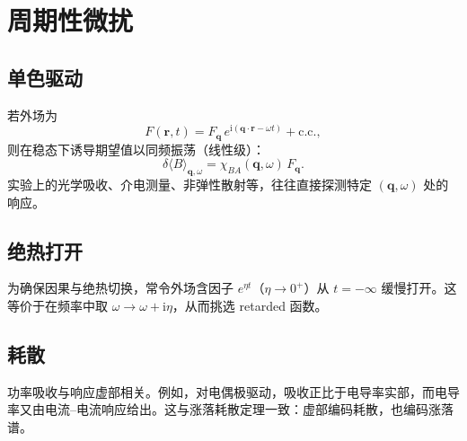 \section{周期性微扰}

\subsection{单色驱动}

若外场为
\begin{equation}
  F(\mathbf{r},t)
  =F_{\mathbf{q}}\,e^{\mathrm{i}(\mathbf{q}\cdot\mathbf{r}-\omega t)}
  +\mathrm{c.c.},
\end{equation}
则在稳态下诱导期望值以同频振荡（线性级）：
\begin{equation}
  \delta\langle B\rangle_{\mathbf{q},\omega}
  =\chi_{BA}(\mathbf{q},\omega)\,F_{\mathbf{q}}.
\end{equation}
实验上的光学吸收、介电测量、非弹性散射等，往往直接探测特定 $(\mathbf{q},\omega)$ 处的响应。

\subsection{绝热打开}

为确保因果与绝热切换，常令外场含因子 $e^{\eta t}$（$\eta\to0^+$）从 $t=-\infty$ 缓慢打开。这等价于在频率中取 $\omega\to\omega+\mathrm{i}\eta$，从而挑选 retarded 函数。

\subsection{耗散}

功率吸收与响应虚部相关。例如，对电偶极驱动，吸收正比于电导率实部，而电导率又由电流--电流响应给出。这与涨落耗散定理一致：虚部编码耗散，也编码涨落谱。
